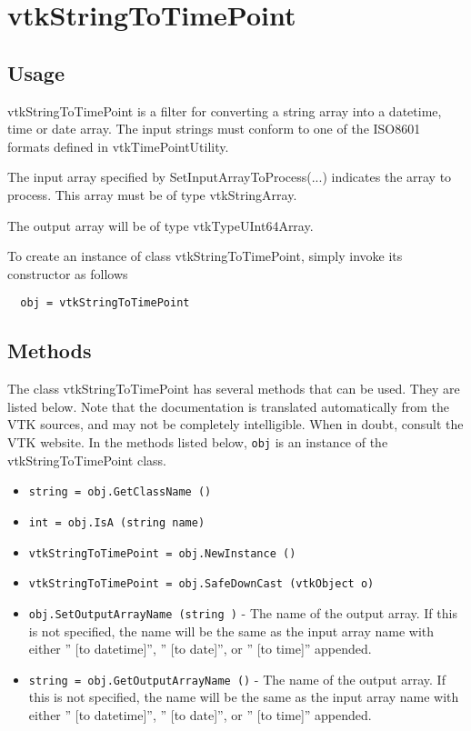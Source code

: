 \section{vtkStringToTimePoint}

\subsection{Usage}


 vtkStringToTimePoint is a filter for converting a string array
 into a datetime, time or date array.  The input strings must
 conform to one of the ISO8601 formats defined in vtkTimePointUtility.

 The input array specified by SetInputArrayToProcess(...)
 indicates the array to process.  This array must be of type
 vtkStringArray.

 The output array will be of type vtkTypeUInt64Array.

To create an instance of class vtkStringToTimePoint, simply
invoke its constructor as follows
\begin{verbatim}
  obj = vtkStringToTimePoint
\end{verbatim}
\subsection{Methods}

The class vtkStringToTimePoint has several methods that can be used.
  They are listed below.
Note that the documentation is translated automatically from the VTK sources,
and may not be completely intelligible.  When in doubt, consult the VTK website.
In the methods listed below, \verb|obj| is an instance of the vtkStringToTimePoint class.
\begin{itemize}
\item  \verb|string = obj.GetClassName ()|

\item  \verb|int = obj.IsA (string name)|

\item  \verb|vtkStringToTimePoint = obj.NewInstance ()|

\item  \verb|vtkStringToTimePoint = obj.SafeDownCast (vtkObject o)|

\item  \verb|obj.SetOutputArrayName (string )| -  The name of the output array.
 If this is not specified, the name will be the same as the input
 array name with either '' [to datetime]'', '' [to date]'', or '' [to time]''
 appended.

\item  \verb|string = obj.GetOutputArrayName ()| -  The name of the output array.
 If this is not specified, the name will be the same as the input
 array name with either '' [to datetime]'', '' [to date]'', or '' [to time]''
 appended.

\end{itemize}
